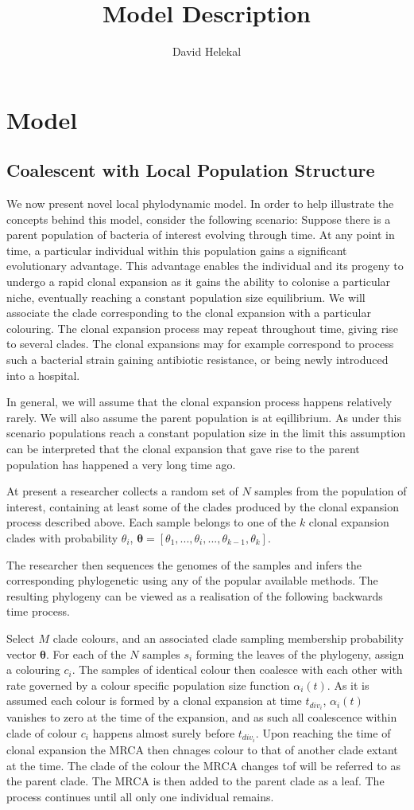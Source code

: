 \documentclass{report}
\title{Model Description}
\author{David Helekal}
\theoremstyle{definition}
\begin{document}
\chapter{Model}
\section{Coalescent with Local Population Structure}
We now present novel local phylodynamic model.
In order to help illustrate the concepts behind this model, consider the following scenario:
Suppose there is a parent population of bacteria of interest evolving through time. At any point in time, a particular individual within this population gains a significant evolutionary advantage. This advantage enables the individual and its progeny to undergo a rapid clonal expansion as it gains the ability to colonise a particular niche, eventually reaching a constant population size equilibrium. We will associate the clade corresponding to the clonal expansion with a particular colouring. 
The clonal expansion process may repeat throughout time, giving rise to several clades. The clonal expansions may for example correspond to process such a bacterial strain gaining antibiotic resistance, or being newly introduced into a hospital.

In general, we will assume that the clonal expansion process happens relatively rarely. We will also assume the parent population is at eqillibrium. As under this scenario populations reach a constant population size in the limit this assumption can be interpreted that the clonal expansion that gave rise to the parent population has happened a very long time ago.

At present a researcher collects a random set of $N$ samples from the population of interest, containing at least some of the clades produced by the clonal expansion process described above. Each sample belongs to one of the $k$ clonal expansion clades with probability $\theta_i$, $\pmb{\theta} = [\theta_1, ..., \theta_i, ..., \theta_{k-1}, \theta_{k}]$.

The researcher then sequences the genomes of the samples and infers the corresponding phylogenetic using any of the popular available methods.
The resulting phylogeny can be viewed as a realisation of the following backwards time process. 

Select $M$ clade colours, and an associated clade sampling membership probability vector $\pmb{\theta}$. For each of the $N$ samples $s_i$ forming the leaves of the phylogeny, assign a colouring $c_i$. The samples of identical colour then coalesce with each other with rate governed by a colour specific population size function $\alpha_i(t)$. As it is assumed each colour is formed by a clonal expansion at time $t_{div_i}$, $\alpha_i(t)$ vanishes to zero at the time of the expansion, and as such all coalescence within clade of colour $c_i$ happens almost surely before $t_{div_i}$. Upon reaching the time of clonal expansion the MRCA then chnages colour to that of another clade extant at the time. The clade of the colour the MRCA changes tof will be referred to as the parent clade. The MRCA is then added to the parent clade as a leaf. 
The process continues until all only one individual remains.
\end{document}

